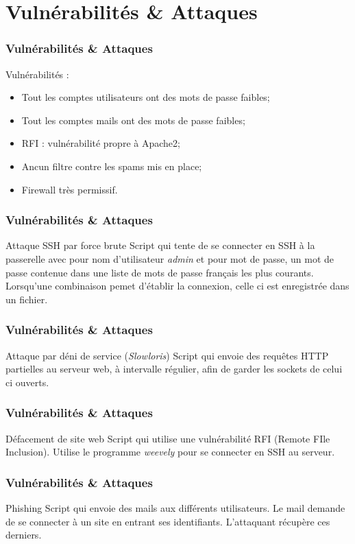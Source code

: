 \documentclass{beamer}
\begin{document}
	\section{Vulnérabilités \& Attaques}
		\begin{frame}
			\frametitle{Vulnérabilités \& Attaques}
			Vulnérabilités :
			\begin{itemize}
				\item Tout les comptes utilisateurs ont des mots de passe faibles;
				\item Tout les comptes mails ont des mots de passe faibles;
				\item RFI : vulnérabilité propre à Apache2;
				\item Ancun filtre contre les spams mis en place;
				\item Firewall très permissif.
			\end{itemize}
		\end{frame}
		\begin{frame}
			\frametitle{Vulnérabilités \& Attaques}
			\begin{block}{Attaque SSH par force brute}
				Script qui tente de se connecter en SSH à la passerelle avec pour nom d'utilisateur \textit{admin} et pour mot de passe, un mot de passe contenue dans une liste de mots de passe français les plus courants.
				Lorsqu'une combinaison pemet d'établir la connexion, celle ci est enregistrée dans un fichier.
			\end{block}
		\end{frame}
		\begin{frame}
			\frametitle{Vulnérabilités \& Attaques}
			\begin{block}{Attaque par déni de service (\textit{Slowloris})}
				Script qui envoie des requêtes HTTP partielles au serveur web, à intervalle régulier, afin de garder les sockets de celui ci ouverts.
			\end{block}
		\end{frame}
		\begin{frame}
			\frametitle{Vulnérabilités \& Attaques}
			\begin{block}{Défacement de site web}
				Script qui utilise une vulnérabilité RFI (Remote FIle Inclusion). Utilise le programme \textit{weevely} pour se connecter en SSH au serveur.
			\end{block}
		\end{frame}
		\begin{frame}
			\frametitle{Vulnérabilités \& Attaques}
			\begin{block}{Phishing}
				Script qui envoie des mails aux différents utilisateurs. Le mail demande de se connecter à un site en entrant ses identifiants. L'attaquant récupère ces derniers.
			\end{block}
		\end{frame}
\end{document}

